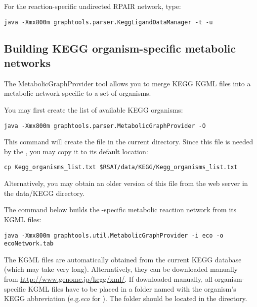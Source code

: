 For the reaction-specific undirected RPAIR network, type:

\begin{verbatim}
java -Xmx800m graphtools.parser.KeggLigandDataManager -t -u
\end{verbatim}

\subsection{Building KEGG organism-specific metabolic networks}

The MetabolicGraphProvider tool allows you to merge KEGG KGML files into
a metabolic network specific to a set of organisms. 

You may first create the list of available KEGG organisms:

\begin{verbatim}
java -Xmx800m graphtools.parser.MetabolicGraphProvider -O
\end{verbatim}

This command will create the file  in the
current directory. Since this file is needed by the
, you may copy it to its default location:

\begin{lstlisting}
cp Kegg_organisms_list.txt $RSAT/data/KEGG/Kegg_organisms_list.txt
\end{lstlisting}

Alternatively, you may obtain an older version of this file from the \neat web
server in the data/KEGG directory. 


The command below builds the -specific metabolic reaction network
from its KGML files:

\begin{verbatim}
java -Xmx800m graphtools.util.MetabolicGraphProvider -i eco -o ecoNetwork.tab
\end{verbatim}

The KGML files are automatically obtained from the current KEGG database
(which may take very long). Alternatively, they can be downloaded manually from
\url{http://www.genome.jp/kegg/xml/}.
If downloaded manually, all organism-specific KGML files have to be placed in a
folder named with the organism's KEGG abbreviation (e.g.\textit{eco}
for ). The folder should be located in the \RSAT{}
directory.
 
